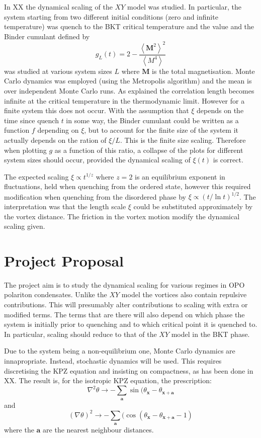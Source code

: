 \documentclass[letterpaper, 10 pt, conference]{IEEEtran}  %
\newcommand{\mean}[1]{\left < #1 \right >}
\newcommand{\myvec}[1]{\boldsymbol{#1}}
\begin{document}
In XX the dynamical scaling of the $XY$ model was studied. 
In particular, the system starting from two different initial conditions (zero and infinite temperature) was quench to the BKT critical temperature and the value and the Binder cumulant defined by 
\[
g_L(t) = 2 - \frac{\mean{\myvec{M}^2}^2}{\mean{M^4}}
\]
was studied at various system sizes $L$ where $\myvec{M}$ is the total magnetisation. 
Monte Carlo dynamics was employed (using the Metropolis algorithm) and the mean is over independent Monte Carlo runs. 
As explained the correlation length becomes infinite at the critical temperature in the thermodynamic limit. 
However for a finite system this does not occur. 
With the assumption that $\xi$ depends on the time since quench $t$ in some way, the Binder cumulant could be written as a function $f$ depending on $\xi$, but to account for the finite size of the system it actually depends on the ration of $\xi/L$.
This is the finite size scaling. 
Therefore when plotting $g$ as a function of this ratio, a collapse of the plots for different system sizes should occur, provided the dynamical scaling of $\xi(t)$ is correct. 

The expected scaling $\xi \propto t^{1/z}$ where $z=2$ is an equilibrium exponent in fluctuations, held when quenching from the ordered state, however this required modification when quenching from the disordered phase by $\xi \propto (t/\ln t)^{1/2}$. 
The interpretation was that the length scale $\xi$ could be substituted approximately by the vortex distance. 
The friction in the vortex motion modify the dynamical scaling given.  

\section{Project Proposal}

The project aim is to study the dynamical scaling for various regimes in OPO polariton condensates. 
Unlike the $XY$ model the vortices also contain repulsive contributions. 
This will presumably alter contributions to scaling with extra or modified terms. 
The terms that are there will also depend on which phase the system is initially prior to quenching and to which critical point it is quenched to. 
In particular, scaling should reduce to that of the $XY$ model in the BKT phase.

Due to the system being a non-equilibrium one, Monte Carlo dynamics are innapropriate.
Instead, stochastic dynamics will be used. 
This requires discretising the KPZ equation and insisting on compactness, as has been done in XX. The result is, for the isotropic KPZ equation, the prescription: 
\[
\nabla^2 \theta \to - \sum_{\myvec{a}} \sin ( \theta_{\myvec{x}} - \theta_{\myvec{x} + \myvec{a}}
\]
and
\[
(\nabla \theta )^2 \to - \sum_{\myvec{a}} ( \cos ( \theta_{\myvec{x}} - \theta_{\myvec{x} + \myvec{a}} - 1 )
\]
where the $\myvec{a}$ are the nearest neighbour distances.
 
\end{document}
